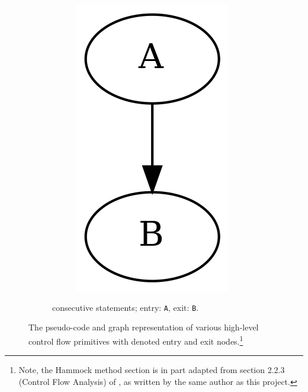 \begin{savenotes}
\begin{figure}[htbp]
\begin{subfigure}[ht]{0.24\textwidth}
\begin{subfigure}[ht]{0.35\textwidth}
				\includegraphics[width=\textwidth]{inc/primitives/seq.png}
			\end{subfigure}
			\caption{consecutive statements; entry: \texttt{A}, exit: \texttt{B}.}
			\label{fig:seq_graph_representation}
		\end{subfigure}
		\caption{The pseudo-code and graph representation of various high-level control flow primitives with denoted entry and exit nodes.\protect\footnote{Note, the Hammock method section is in part adapted from section 2.2.3 (Control Flow Analysis) of \cite{compositional_decompilation}, as written by the same author as this project.}}
		\label{fig:graph_representations}
	\end{figure}
\end{savenotes}

